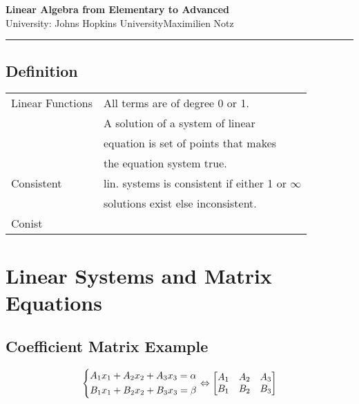 \documentclass[5pt]{article}
\begin{document}
\begin{center}
     \Large{\textbf{Linear Algebra from Elementary to Advanced}}\\
     \footnotesize{University: Johns Hopkins University}\hfill\footnotesize{\textcopyright Maximilien Notz \the\year{}}
     \noindent\rule{20.2cm}{0.4pt}
\end{center}


\begin{multicols}{2}
\setcounter{secnumdepth}{0}


\subsection{Definition}
\begin{tabular}{ll}
    Linear Functions & All terms are of  degree 0 or 1. \\
                   & A solution of a system of linear \\ 
                   & equation is set of points that makes \\
                   & the equation system true. \\
     Consistent    & lin. systems is consistent if either 1 or $\infty$ \\
                   & solutions exist else inconsistent.\\
     Conist
\end{tabular}

\section{Linear Systems and Matrix Equations}
\subsection{Coefficient Matrix Example}
\begin{equation}
\centering
\left\{\begin{split}
A_1x_1+A_2x_2+A_3x_3=\alpha \\
B_1x_1+B_2x_2+B_3x_3=\beta \\
\end{split}\right.
\Leftrightarrow
\begin{bmatrix}
    A_1 & A_2 & A_3\\
    B_1 & B_2 & B_3\\
\end{bmatrix}
\end{equation}


\end{multicols}
\end{document}
